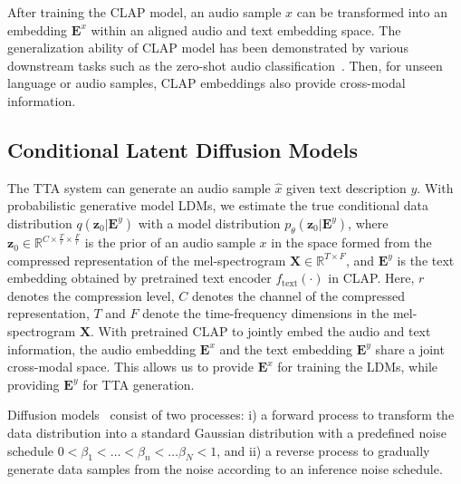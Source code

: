 \documentclass{article}
\begin{document}
After training the CLAP model, an audio sample $x$ can be transformed into an embedding $\boldsymbol{E}^{x}$ within an aligned audio and text embedding space. The generalization ability of CLAP model has been demonstrated by various downstream tasks such as the zero-shot audio classification~\cite{wu2022large}. Then, for unseen language or audio samples, CLAP embeddings also provide cross-modal information.

\subsection{Conditional Latent Diffusion Models}
\label{CLDMs}

The TTA system can generate an audio sample $\hat{x}$ given text description $y$. With probabilistic generative model LDMs, we estimate the true conditional data distribution $q(\boldsymbol{z}_{0}|\boldsymbol{E}^{y})$ with a model distribution $p_{\theta}(\boldsymbol{z}_{0}|\boldsymbol{E}^{y})$, where $\boldsymbol{z}_{0}\in \mathbb{R}^{C\times \frac{T}{r}\times \frac{F}{r}}$ is the prior of an audio sample $x$ in the space formed from the compressed representation of the mel-spectrogram $\boldsymbol{X}\in \mathbb{R}^{T\times F}$, and $\boldsymbol{E}^{y}$ is the text embedding obtained by pretrained text encoder $f_{\text{text}}(\cdot)$ in CLAP. Here, $r$ denotes the compression level, $C$ denotes the channel of the compressed representation, $T$ and $F$ denote the time-frequency dimensions in the mel-spectrogram $\boldsymbol{X}$. With pretrained CLAP to jointly embed the audio and text information, the audio embedding $\boldsymbol{E}^{x}$ and the text embedding $\boldsymbol{E}^{y}$ share a joint cross-modal space. This allows us to provide $\boldsymbol{E}^{x}$ for training the LDMs, while providing $\boldsymbol{E}^{y}$ for TTA generation.

Diffusion models~\cite{DDPM, SGM} consist of two processes: i) a forward process to transform the data distribution into a standard Gaussian distribution with a predefined noise schedule $ 0 < \beta_{1} < \dots < \beta_{n} < \dots \beta_{N} < 1$, and ii) a reverse process to gradually generate data samples from the noise according to an inference noise schedule. 
\end{document}
